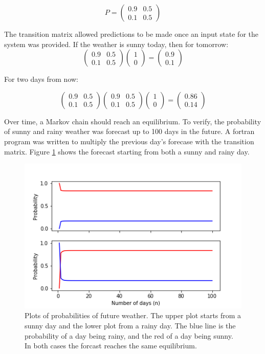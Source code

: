 \documentclass[twocolumn]{article}
\begin{document}
\[ P = \begin{pmatrix}
	0.9 & 0.5 \\
	0.1 & 0.5
\end{pmatrix} \]

The transition matrix allowed predictions to be made once an input state for the system was provided. If the weather is sunny today, then for tomorrow:
\[ 
\begin{pmatrix} 0.9 & 0.5 \\ 0.1 & 0.5 \end{pmatrix} \begin{pmatrix} 1 \\ 0\end{pmatrix}
= \begin{pmatrix}0.9 \\ 0.1 \end{pmatrix}
\]

For two days from now:

\[
\begin{pmatrix} 0.9 & 0.5 \\ 0.1 & 0.5 \end{pmatrix} \begin{pmatrix} 0.9 & 0.5 \\ 0.1 & 0.5 \end{pmatrix} \begin{pmatrix} 1 \\ 0\end{pmatrix}
=
\begin{pmatrix} 0.86 \\ 0.14\end{pmatrix}
\]

Over time, a Markov chain should reach an equilibrium. To verify, the probability of sunny and rainy weather was forecast up to 100 days in the future. A fortran program was written to multiply the previous day's forecase with the transition matrix. Figure \ref{fig:fig13} shows the forecast starting from both a sunny and rainy day.

\begin{figure}
\centering
\includegraphics[width=\linewidth]{fig13}
\caption{Plots of probabilities of future weather. The upper plot starts from a sunny day and the lower plot from a rainy day. The blue line is the probability of a day being rainy, and the red of a day being sunny. In both cases the forcast reaches the same equilibrium.}
\label{fig:fig13}
\end{figure}
\end{document}
